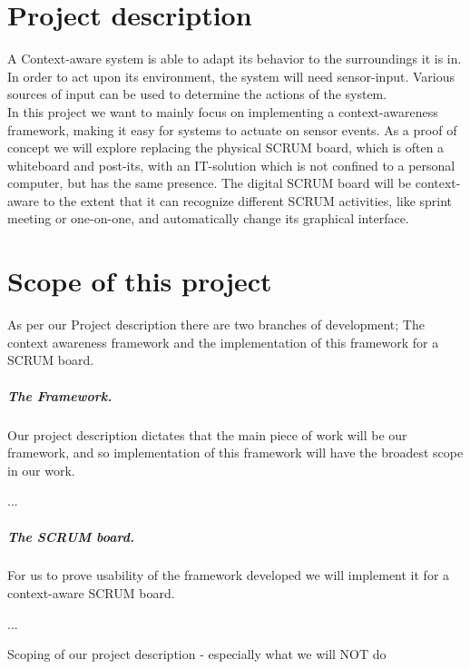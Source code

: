 \documentclass[]{report}
\begin{document}
\graphicspath{{img/}{../img/}}


\begin{abstract}
\end{abstract}


\chapter{Project description}
A Context-aware system is able to adapt its behavior to the surroundings it is in. In order to act upon its environment, the system will need sensor-input. Various sources of input can be used to determine the actions of the system.\\

In this project we want to mainly focus on implementing a context-awareness framework, making it easy for systems to actuate on sensor events. As a proof of concept we will explore replacing the physical SCRUM board, which is often a whiteboard and post-its, with an IT-solution which is not confined to a personal computer, but has the same presence. The digital SCRUM board will be context-aware to the extent that it can recognize different SCRUM activities, like sprint meeting or one-on-one, and automatically change its graphical interface.


\chapter{Scope of this project}

As per our Project description there are two branches of development; The context awareness framework and the implementation of this framework for a SCRUM board.

\paragraph{The Framework.} Our project description dictates that the main piece of work will be our framework, and so implementation of this framework will have the broadest scope in our work.

...

\paragraph{The SCRUM board.} For us to prove usability of the framework developed we will implement it for a context-aware SCRUM board.

...

Scoping of our project description - especially what we will NOT do
\end{document}
